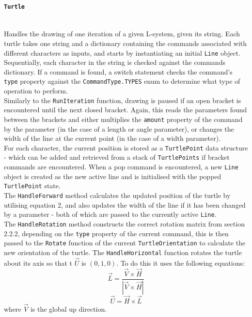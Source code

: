 \documentclass[12pt]{article}
\begin{document}
\paragraph{{\large\texttt{Turtle}}}\mbox{} \\
Handles the drawing of one iteration of a given L-system, given its string. Each turtle takes one string and a dictionary containing the commands associated with different characters as inputs, and starts by instantiating an initial \texttt{Line} object. Sequentially, each character in the string is checked against the commands dictionary. If a command is found, a switch statement checks the command's \texttt{type} property against the \texttt{CommandType.TYPES} enum to determine what type of operation to perform. \\ Similarly to the \texttt{RunIteration} function, drawing is paused if an open bracket is encountered until the next closed bracket. Again, this reads the parameters found between the brackets and either multiplies the \texttt{amount} property of the command by the parameter (in the case of a length or angle parameter), or changes the width of the line at the current point (in the case of a width parameter).\\ For each character, the current position is stored as a \texttt{TurtlePoint} data structure - which can be added and retrieved from a stack of \texttt{TurtlePoints} if bracket commands are encountered. When a pop command is encountered, a new \texttt{Line} object is created as the new active line and is initialised with the popped \texttt{TurtlePoint} state. \\
The \texttt{HandleForward} method calculates the updated position of the turtle by utilising equation 2, and also updates the width of the line if it has been changed by a parameter - both of which are passed to the currently active \texttt{Line}. \\ The \texttt{HandleRotation} method constructs the correct rotation matrix from section 2.2.2, depending on the \texttt{type} property of the current command, this is then passed to the \texttt{Rotate} function of the current \texttt{TurtleOrientation} to calculate the new orientation of the turtle.  The \texttt{HandleHorizontal} function rotates the turtle about its axis so that t \(\vec{U}\) is \((0,1,0)\). To do this it uses the following equations:
\begin{equation*}
\vec{L} = \frac{\vec{V} \times \vec{H}}{|\vec{V} \times \vec{H}|}
\end{equation*}
\begin{equation*}
\vec{U} = \vec{H} \times \vec{L}
\end{equation*}
where \( \vec{V}\) is the global up direction.
\end{document}
